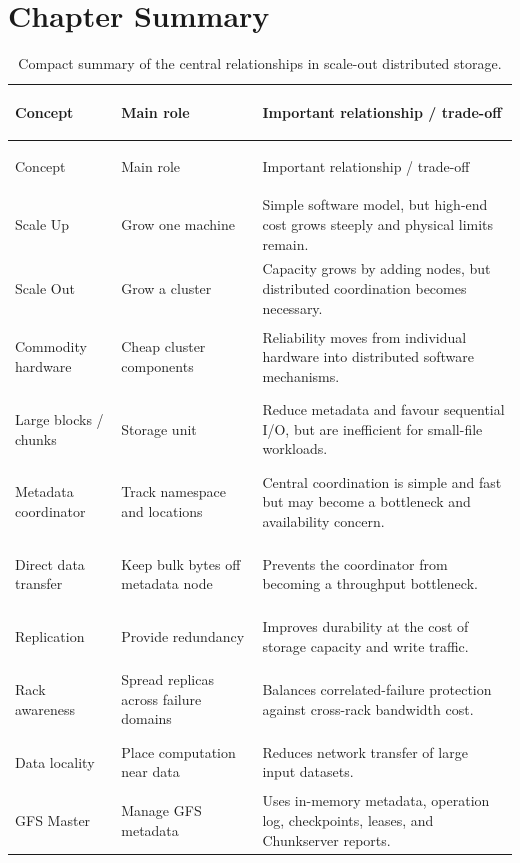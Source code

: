 \documentclass[11pt,a4paper,oneside]{book}
\begin{document}
\section{Chapter Summary}

\begin{longtable}{>{\bfseries\raggedright\arraybackslash}p{} >{\raggedright\arraybackslash}p{} >{\raggedright\arraybackslash}p{}}
\caption{Compact summary of the central relationships in scale-out distributed storage.}
\label{tab:storage-core-relationships}\\
\toprule
Concept & Main role & Important relationship / trade-off \\
\midrule
\endfirsthead
\toprule
Concept & Main role & Important relationship / trade-off \\
\midrule
\endhead
Scale Up & Grow one machine & Simple software model, but high-end cost grows steeply and physical limits remain. \\
Scale Out & Grow a cluster & Capacity grows by adding nodes, but distributed coordination becomes necessary. \\
Commodity hardware & Cheap cluster components & Reliability moves from individual hardware into distributed software mechanisms. \\
Large blocks / chunks & Storage unit & Reduce metadata and favour sequential I/O, but are inefficient for small-file workloads. \\
Metadata coordinator & Track namespace and locations & Central coordination is simple and fast but may become a bottleneck and availability concern. \\
Direct data transfer & Keep bulk bytes off metadata node & Prevents the coordinator from becoming a throughput bottleneck. \\
Replication & Provide redundancy & Improves durability at the cost of storage capacity and write traffic. \\
Rack awareness & Spread replicas across failure domains & Balances correlated-failure protection against cross-rack bandwidth cost. \\
Data locality & Place computation near data & Reduces network transfer of large input datasets. \\
GFS Master & Manage GFS metadata & Uses in-memory metadata, operation log, checkpoints, leases, and Chunkserver reports. \\

\end{longtable}
\end{document}
